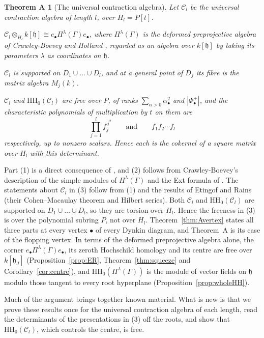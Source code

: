 \documentclass[11pt]{amsart}
\numberwithin{table}{section}
\numberwithin{figure}{section}
\numberwithin{equation}{section}
\theoremstyle{definition}
\theoremstyle{plain}
\newtheorem*{thmA}{Theorem A}
\newcommand{\cC}{\mathcal{C}}
\newcommand{\h}{\mathfrak{h}}
\newcommand{\bul}{\bullet}
\newcommand{\HH}{\mathrm{HH}}
\begin{document}
\begin{thmA}[The universal contraction algebra]
Let $\cC_l$ be the universal contraction algebra of length $l$, over $H_l = P[t]$.
\begin{thmlist}
\item $\cC_l \otimes_{H_l} k[\h] \cong e_\bul \Pi^\lambda(\Gamma) e_\bul$, where $\Pi^\lambda(\Gamma)$ is the deformed preprojective algebra of Crawley-Boevey and Holland \cite{CBH}, regarded as an algebra over $k[\h]$ by taking its parameters $\lambda$ as coordinates on $\h$.
\item $\cC_l$ is supported on $D_1 \cup \dots \cup D_l$, and at a general point of $D_j$ its fibre is the matrix algebra $M_j(k)$.
\item $\cC_l$ and $\HH_0(\cC_l)$ are free over $P$, of ranks $\sum_{\alpha > 0} \alpha_\bul^2$ and $|\Phi^+_\bul|$, and the characteristic polynomials of multiplication by $t$ on them are
\[
\prod_{j=1}^{l} f_j^{\,j^2} \qquad\text{and}\qquad f_1 f_2 \cdots f_l
\]
respectively, up to nonzero scalars. Hence each is the cokernel of a square matrix over $H_l$ with this determinant.
\end{thmlist}
\end{thmA}

Part (1) is a direct consequence of \cite{K}, and (2) follows from Crawley-Boevey's description of the simple modules of $\Pi^\lambda(\Gamma)$ \cite{CB} and the Ext formula of \cite{CBK}. The statements about $\cC_l$ in (3) follow from (1) and the results of Etingof and Rains \cite{ER} (their Cohen--Macaulay theorem and Hilbert series). Both $\cC_l$ and $\HH_0(\cC_l)$ are supported on $D_1 \cup \dots \cup D_l$, so they are torsion over $H_l$. Hence the freeness in (3) is over the polynomial subring $P$, not over $H_l$. Theorem~\ref{thm:Avertex} states all three parts at every vertex $\bul$ of every Dynkin diagram, and Theorem~A is its case of the flopping vertex. In terms of the deformed preprojective algebra alone, the corner $e_\bul\Pi^\lambda(\Gamma)e_\bul$, its zeroth Hochschild homology and its centre are free over $k[\h_J]$ (Proposition~\ref{prop:ER}, Theorem~\ref{thm:squeeze} and Corollary~\ref{cor:centre}), and $\HH_0(\Pi^\lambda(\Gamma))$ is the module of vector fields on $\h$ modulo those tangent to every root hyperplane (Proposition~\ref{prop:wholeHH}).

Much of the argument brings together known material. What is new is that we prove these results once for the universal contraction algebra of each length, read the determinants of the presentations in (3) off the roots, and show that $\HH_0(\cC_l)$, which controls the centre, is free.
\end{document}
